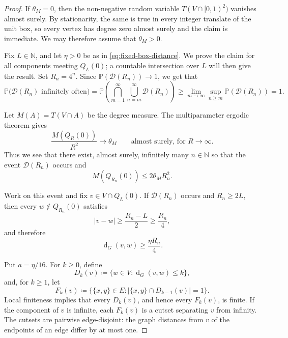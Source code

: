 \documentclass[11pt,a4paper]{scrartcl}
\renewcommand{\P}{\mathbb{P}}
\newcommand{\N}{\mathbb{N}}
\newcommand{\1}{\mathbb{1}}
\newcommand{\dG}{\operatorname{d}_{G}}
\begin{document}
\begin{proof}
If \(\theta_M=0\), then the non-negative random variable
\(T(V\cap[0,1)^2)\) vanishes almost surely. By stationarity, the same is true
in every integer translate of the unit box, so every vertex has degree zero
almost surely and the claim is immediate. We may therefore assume that
\(\theta_M>0\).

Fix \(L\in\N\), and let \(\eta>0\) be as in
\eqref{eq:fixed-box-distance}. We prove the claim for all components meeting
\(Q_L(0)\); a countable intersection over \(L\) will then give the result.
Set \(R_n=4^n\).  Since
\(\P(\mathcal D(R_n))\to1\), we get that
\[
  \P\big(\mathcal D(R_n)\text{ infinitely often}\big) = \P\left( \bigcap_{m=1}^{\infty} \bigcup_{n= m}^{\infty} \mathcal D(R_n)\right)
  \geq 
  \lim_{m\to \infty} \sup_{n \geq m}
  \P\left( \mathcal D(R_n)\right)=1.
\]

Let \(M(A)=T(V\cap A)\) be the degree measure.  The multiparameter ergodic
theorem gives
\[
  \frac{M(Q_R(0))}{R^2}\longrightarrow\theta_M
  \qquad\text{almost surely, for } R\to \infty.
\]
Thus we see that there exist, almost surely, infinitely many $n \in \N$ so that
the event \(\mathcal D(R_n)\) occurs and
\begin{equation}
\label{eq:direct-degree-volume}
  M(Q_{R_n}(0))\le 2 \theta_M R_n^2.
\end{equation}


Work on this event and fix \(v\in V\cap Q_L(0)\). If \(\mathcal D(R_n)\)
occurs and \(R_n\ge2L\), then every
\(w\notin Q_{R_n}(0)\) satisfies
\[
  |v-w|
  \ge \frac{R_n-L}{2}
  \ge \frac{R_n}{4},
\]
and therefore
\begin{equation}
\label{eq:direct-distance-outside}
  \dG(v,w)\ge\frac{\eta R_n}{4}.
\end{equation}

Put \(a=\eta/16\).  For \(k\ge0\), define
\[
  D_k(v) \coloneqq \{w\in V:\dG(v,w)\le k\},
\]
and, for \(k\ge1\), let
\[
  F_k(v) \coloneqq
  \big\{\{x,y\}\in E:|\{x,y\}\cap D_{k-1}(v)|=1\big\}.
\]
Local finiteness implies that every \(D_k(v)\), and hence every \(F_k(v)\),
is finite.  If the component of \(v\) is infinite, each \(F_k(v)\) is a cutset
separating \(v\) from infinity.  The cutsets are pairwise edge-disjoint: the
graph distances from \(v\) of the endpoints of an edge differ by at most one.


\end{proof}
\end{document}

